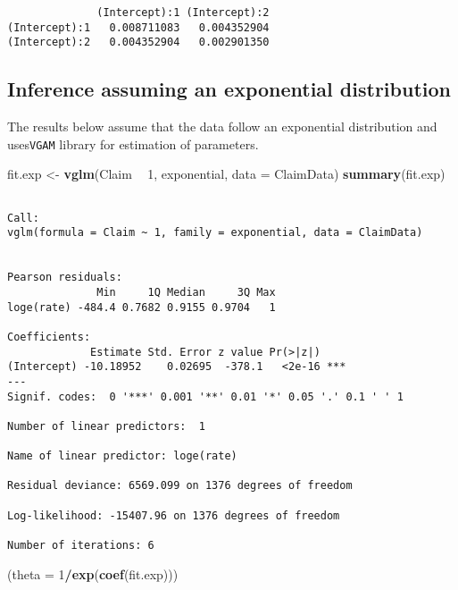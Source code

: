 \documentclass[]{book}
\newenvironment{Shaded}{\begin{snugshade}}{\end{snugshade}}
\newcommand{\KeywordTok}[1]{\textcolor[rgb]{0.13,0.29,0.53}{\textbf{#1}}}
\newcommand{\DataTypeTok}[1]{\textcolor[rgb]{0.13,0.29,0.53}{#1}}
\newcommand{\DecValTok}[1]{\textcolor[rgb]{0.00,0.00,0.81}{#1}}
\newcommand{\StringTok}[1]{\textcolor[rgb]{0.31,0.60,0.02}{#1}}
\newcommand{\OperatorTok}[1]{\textcolor[rgb]{0.81,0.36,0.00}{\textbf{#1}}}
\newcommand{\NormalTok}[1]{#1}
\theoremstyle{definition}
\theoremstyle{definition}
\theoremstyle{definition}
\theoremstyle{remark}
\begin{document}
\begin{verbatim}
              (Intercept):1 (Intercept):2
(Intercept):1   0.008711083   0.004352904
(Intercept):2   0.004352904   0.002901350
\end{verbatim}

\subsection{Inference assuming an exponential
distribution}\label{inference-assuming-an-exponential-distribution}

The results below assume that the data follow an exponential
distribution and uses\texttt{VGAM} library for estimation of parameters.

\begin{Shaded}
\begin{Highlighting}[]
\NormalTok{fit.exp <-}\StringTok{ }\KeywordTok{vglm}\NormalTok{(Claim }\OperatorTok{~}\StringTok{ }\DecValTok{1}\NormalTok{, exponential, }\DataTypeTok{data =}\NormalTok{ ClaimData)}
\KeywordTok{summary}\NormalTok{(fit.exp)}
\end{Highlighting}
\end{Shaded}

\begin{verbatim}

Call:
vglm(formula = Claim ~ 1, family = exponential, data = ClaimData)


Pearson residuals:
              Min     1Q Median     3Q Max
loge(rate) -484.4 0.7682 0.9155 0.9704   1

Coefficients: 
             Estimate Std. Error z value Pr(>|z|)    
(Intercept) -10.18952    0.02695  -378.1   <2e-16 ***
---
Signif. codes:  0 '***' 0.001 '**' 0.01 '*' 0.05 '.' 0.1 ' ' 1

Number of linear predictors:  1 

Name of linear predictor: loge(rate) 

Residual deviance: 6569.099 on 1376 degrees of freedom

Log-likelihood: -15407.96 on 1376 degrees of freedom

Number of iterations: 6 
\end{verbatim}

\begin{Shaded}
\begin{Highlighting}[]
\NormalTok{(}\DataTypeTok{theta =} \DecValTok{1}\OperatorTok{/}\KeywordTok{exp}\NormalTok{(}\KeywordTok{coef}\NormalTok{(fit.exp)))}
\end{Highlighting}
\end{Shaded}
\end{document}
